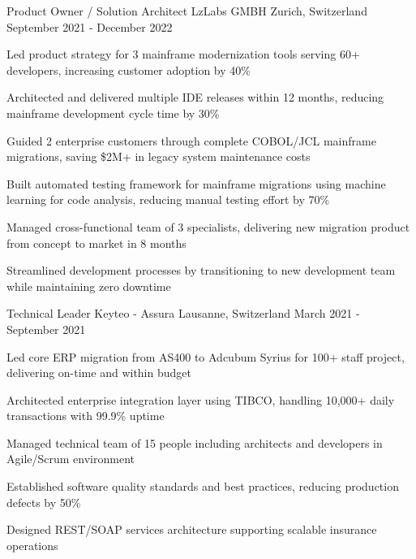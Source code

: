 \begin{cventries}
{    }
    \cventry
    {Product Owner / Solution Architect} %
    {LzLabs GMBH} %
    {Zurich, Switzerland} %
    {September 2021 - December 2022} %
    {
        \begin{cvitems} %
            \item{Led product strategy for 3 mainframe modernization tools serving 60+ developers, increasing customer adoption by 40\%}
            \item{Architected and delivered multiple IDE releases within 12 months, reducing mainframe development cycle time by 30\%}
            \item{Guided 2 enterprise customers through complete COBOL/JCL mainframe migrations, saving \$2M+ in legacy system maintenance costs}
            \item{Built automated testing framework for mainframe migrations using machine learning for code analysis, reducing manual testing effort by 70\%}
            \item{Managed cross-functional team of 3 specialists, delivering new migration product from concept to market in 8 months}
            \item{Streamlined development processes by transitioning to new development team while maintaining zero downtime}
        \end{cvitems}
    }
    \cventry
    {Technical Leader} %
    {Keyteo - Assura} %
    {Lausanne, Switzerland} %
    {March 2021 - September 2021} %
    {
        \begin{cvitems} %
            \item{Led core ERP migration from AS400 to Adcubum Syrius for 100+ staff project, delivering on-time and within budget}
            \item{Architected enterprise integration layer using TIBCO, handling 10,000+ daily transactions with 99.9\% uptime}
            \item{Managed technical team of 15 people including architects and developers in Agile/Scrum environment}
            \item{Established software quality standards and best practices, reducing production defects by 50\%}
            \item{Designed REST/SOAP services architecture supporting scalable insurance operations}

\end{cvitems}}
\end{cventries}

